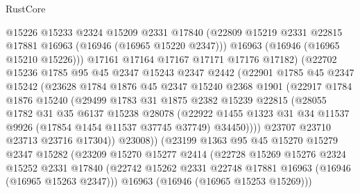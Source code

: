 \begin{lexlean}{RustCore}
\begin{coremodule}
                  @15226
                  @15233
                  @2324
                  @15209
                  @2331
                  @17840
                  (@22809 @15219 @2331 @22815 @17881 @16963 (@16946 (@16965 @15220 @2347)))
                  @16963
                  (@16946 (@16965 @15210 @15226)))
                @17161
                @17164
                @17167
                @17171
                @17176
                @17182)
              (@22702
                @15236
                @1785
                @95
                @45
                @2347
                @15243
                @2347
                @2442
                (@22901
                  @1785
                  @45
                  @2347
                  @15242
                  (@23628
                    @1784
                    @1876
                    @45
                    @2347
                    @15240
                    @2368
                    @1901
                    (@22917
                      @1784
                      @1876
                      @15240
                      (@29499
                        @1783
                        @31
                        @1875
                        @2382
                        @15239
                        @22815
                        (@28055
                          @1782
                          @31
                          @35
                          @6137
                          @15238
                          @28078
                          (@22922
                            @1455
                            @1323
                            @31
                            @34
                            @11537
                            @9926
                            (@17854 @1454 @11537 @37745 @37749)
                            @34450))))
                    @23707
                    @23710
                    @23713
                    @23716
                    @17304))
                @23008))
            (@23199
              @1363
              @95
              @45
              @15270
              @15279
              @2347
              @15282
              (@23209
                @15270
                @15277
                @2414
                (@22728
                  @15269
                  @15276
                  @2324
                  @15252
                  @2331
                  @17840
                  (@22742 @15262 @2331 @22748 @17881 @16963 (@16946 (@16965 @15263 @2347)))
                  @16963
                  (@16946 (@16965 @15253 @15269)))

\end{coremodule}
\end{lexlean}
